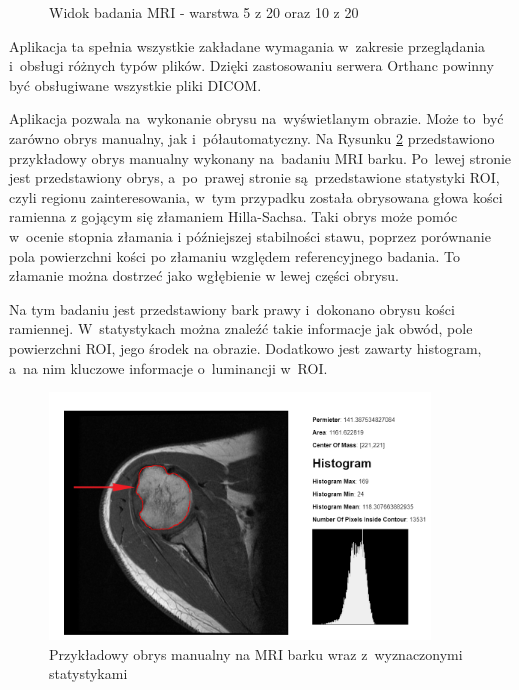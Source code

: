 \documentclass[a4paper,11pt,twoside,openright]{report}
\theoremstyle{definition}
\begin{document}
\begin{figure}[h!]
\begin{center}
\begin{center}
	\end{center}
	\endminipage\hfill
	\caption{Widok badania MRI - warstwa 5 z 20 oraz 10 z 20}
	\label{fig:140}
\end{center}
\end{figure}


Aplikacja ta spełnia wszystkie zakładane wymagania w~zakresie przeglądania i~obsługi różnych typów plików.
Dzięki zastosowaniu serwera Orthanc powinny być obsługiwane wszystkie pliki DICOM.

Aplikacja pozwala na~wykonanie obrysu na~wyświetlanym obrazie. Może to~być zarówno obrys
manualny, jak i~półautomatyczny. Na Rysunku \ref{fig:105} przedstawiono przykładowy obrys manualny
wykonany na~badaniu MRI barku. Po~lewej stronie jest przedstawiony obrys, a~po~prawej
stronie są~przedstawione statystyki ROI, czyli regionu zainteresowania, w~tym przypadku
została obrysowana głowa kości ramienna z gojącym się złamaniem Hilla-Sachsa. Taki obrys może pomóc w~ocenie
stopnia złamania i późniejszej stabilności stawu, poprzez porównanie pola powierzchni kości po złamaniu
względem referencyjnego badania. To złamanie można dostrzeć jako wgłębienie w lewej części obrysu.

Na tym badaniu jest przedstawiony bark prawy i~dokonano obrysu kości ramiennej. W~statystykach można
znaleźć takie informacje jak obwód, pole powierzchni ROI, jego środek na obrazie. Dodatkowo jest zawarty
histogram, a~na nim kluczowe informacje o~luminancji w~ROI.

\pagebreak



\begin{figure}[h!]
	\center
	\includegraphics[width=0.9\textwidth]{105b}
	\caption{Przykładowy obrys manualny na MRI barku wraz z~wyznaczonymi statystykami}
    	\label{fig:105}
\end{figure}
\end{document}
